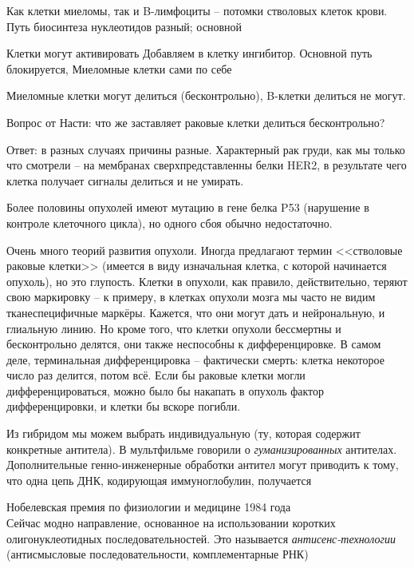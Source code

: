 \documentclass[main.tex]{subfiles}
\begin{document}
Как клетки миеломы, так и B-лимфоциты -- потомки стволовых клеток крови.
Путь биосинтеза нуклеотидов разный; основной %

Клетки могут активировать
Добавляем в клетку ингибитор.
Основной путь блокируется,
Миеломные клетки сами по себе 

Миеломные клетки могут делиться (бесконтрольно), B-клетки делиться не могут.

\begin{leftbar}
	Вопрос от Насти: что же заставляет раковые клетки делиться бесконтрольно?
	
	Ответ: в разных случаях причины разные.
	Характерный рак груди, как мы только что смотрели -- на мембранах сверхпредставленны белки HER2, в результате чего клетка получает сигналы делиться и не умирать.
	
	Более половины опухолей имеют мутацию в гене белка P53 (нарушение в контроле клеточного цикла), но одного сбоя обычно недостаточно.
	
	Очень много теорий развития опухоли.
	Иногда предлагают термин <<стволовые раковые клетки>> (имеется в виду изначальная клетка, с которой начинается опухоль), но это глупость. %
	Клетки в опухоли, как правило, действительно, теряют свою маркировку -- к примеру, в клетках опухоли мозга мы часто не видим тканеспецифичные маркёры.
	Кажется, что они могут дать и нейрональную, и глиальную линию.
	Но кроме того, что клетки опухоли бессмертны и бесконтрольно делятся, они также неспособны к дифференцировке.
	В самом деле, терминальная дифференцировка -- фактически смерть: клетка некоторое число раз делится, потом всё.
	Если бы раковые клетки могли дифференцироваться, можно было бы накапать в опухоль фактор дифференцировки, и клетки бы вскоре погибли.
\end{leftbar}

Из гибридом мы можем выбрать индивидуальную (ту, которая содержит конкретные антитела).
В мультфильме говорили о \emph{гуманизированных} антителах.
Дополнительные генно-инженерные обработки антител могут приводить к тому, что одна цепь ДНК, кодирующая иммуноглобулин, получается

Нобелевская премия по физиологии и медицине 1984 года \\

Сейчас модно направление, основанное на использовании коротких олигонуклеотидных последовательностей.
Это называется \emph{антисенс-технологии} (антисмысловые последовательности, комплементарные РНК)
\end{document}
